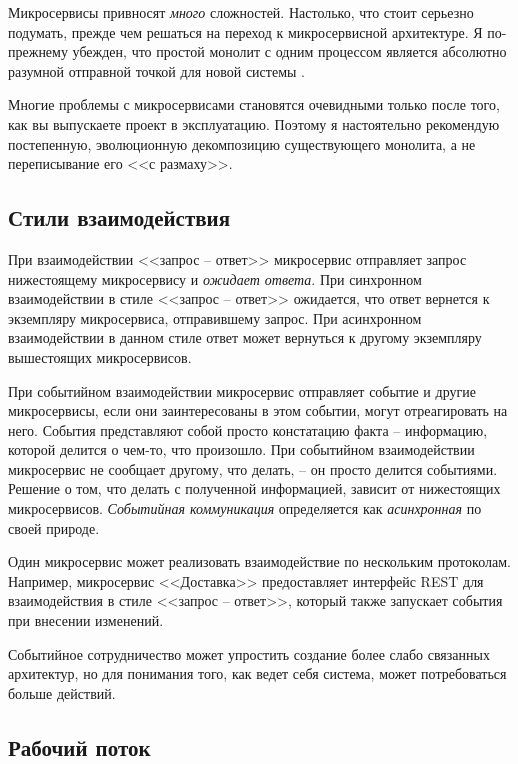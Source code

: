 \documentclass[%
	11pt,
	a4paper,
	utf8,
		]{article}
\begin{document}
Микросервисы привносят \emph{много} сложностей. Настолько, что стоит серьезно подумать, прежде чем решаться на переход к микросервисной архитектуре. Я по-прежнему убежден, что простой монолит с одним процессом является абсолютно разумной отправной точкой для новой системы \cite[]{microservices-2024}.

Многие проблемы с микросервисами становятся очевидными только после того, как вы выпускаете проект в эксплуатацию. Поэтому я настоятельно рекомендую постепенную, эволюционную декомпозицию существующего монолита, а не переписывание его <<с размаху>>.

\subsection{Стили взаимодействия}

При взаимодействии <<запрос -- ответ>> микросервис отправляет запрос нижестоящему микросервису и \emph{ожидает ответа}. При синхронном взаимодействии в стиле <<запрос -- ответ>> ожидается, что ответ вернется к экземпляру микросервиса, отправившему запрос. При асинхронном взаимодействии в данном стиле ответ может вернуться к другому экземпляру вышестоящих микросервисов.

При событийном взаимодействии микросервис отправляет событие и другие микросервисы, если они заинтересованы в этом событии, могут отреагировать на него. События представляют собой просто констатацию факта -- информацию, которой делится о чем-то, что произошло. При событийном взаимодействии микросервис не сообщает другому, что делать, -- он просто делится событиями. Решение о том, что делать с полученной информацией, зависит от нижестоящих микросервисов. \emph{Событийная коммуникация} определяется как \emph{асинхронная} по своей природе.

Один микросервис может реализовать взаимодействие по нескольким протоколам. Например, микросервис <<Доставка>> предоставляет интерфейс REST для взаимодействия в стиле <<запрос -- ответ>>, который также запускает события при внесении изменений.

Событийное сотрудничество может упростить создание более слабо связанных архитектур, но для понимания того, как ведет себя система, может потребоваться больше действий.

\subsection{Рабочий поток}
\end{document}
